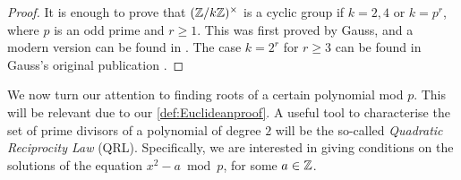 \documentclass[../main.tex]{subfiles}
\begin{document}
\begin{proof}
	It is enough to prove that $(\mathbb{Z}/k\mathbb{Z})^\times$ is a cyclic group if $k=2, 4$ or $k=p^r$, where $p$ is an odd prime and $r\geqslant 1$. This was first proved by Gauss, and a modern version can be found in \cite[Pages $61$, $62$ and $92$]{Shanks}. The case $k=2^r$ for $r\geqslant 3$ can be found in Gauss's original publication \cite{Gauss}.
\end{proof}

We now turn our attention to finding roots of a certain polynomial mod $p$. This will be relevant due to our \cref{def:Euclideanproof}. A useful tool to characterise the set of prime divisors of a polynomial of degree $2$ will be the so-called \emph{Quadratic Reciprocity Law} (QRL). Specifically, we are interested in giving conditions on the solutions of the equation $x^2-a \bmod{p}$, for some $a\in\mathbb{Z}$.
\end{document}
